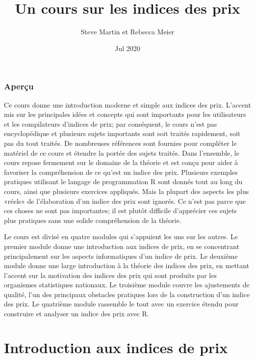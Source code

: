\documentclass[]{article}
\title{Un cours sur les indices des prix}
\author{Steve Martin et Rebecca Meier}
\date{Jul 2020}
\begin{document}
\maketitle

{
\setcounter{tocdepth}{2}
\tableofcontents
}
\hypertarget{aperuxe7u}{%
\section*{Aperçu}\label{aperuxe7u}}

Ce cours donne une introduction moderne et simple aux indices des prix. L'accent mis sur les principales idées et concepts qui sont importants pour les utilisateurs et les compilateurs d'indices de prix; par conséquent, le cours n'est pas encyclopédique et plusieurs sujets importants sont soit traités rapidement, soit pas du tout traités. De nombreuses références sont fournies pour compléter le matériel de ce cours et étendre la portée des sujets traités. Dans l'ensemble, le cours repose fermement sur le domaine de la théorie et est conçu pour aider à favoriser la compréhension de ce qu'est un indice des prix. Plusieurs exemples pratiques utilisant le langage de programmation R sont donnés tout au long du cours, ainsi que plusieurs exercices appliqués. Mais la plupart des aspects les plus «réels» de l'élaboration d'un indice des prix sont ignorés. Ce n'est pas parce que ces choses ne sont pas importantes; il est plutôt difficile d'apprécier ces sujets plus pratiques sans une solide compréhension de la théorie.

Le cours est divisé en quatre modules qui s'appuient les uns sur les autres. Le premier module donne une introduction aux indices de prix, en se concentrant principalement sur les aspects informatiques d'un indice de prix. Le deuxième module donne une large introduction à la théorie des indices des prix, en mettant l'accent sur la motivation des indices des prix qui sont produits par les organismes statistiques nationaux. Le troisième module couvre les ajustements de qualité, l'un des principaux obstacles pratiques lors de la construction d'un indice des prix. Le quatrième module rassemble le tout avec un exercice étendu pour construire et analyser un indice des prix avec R.

\hypertarget{part-introduction-aux-indices-de-prix}{%
\part{Introduction aux indices de prix}\label{part-introduction-aux-indices-de-prix}}
\end{document}
